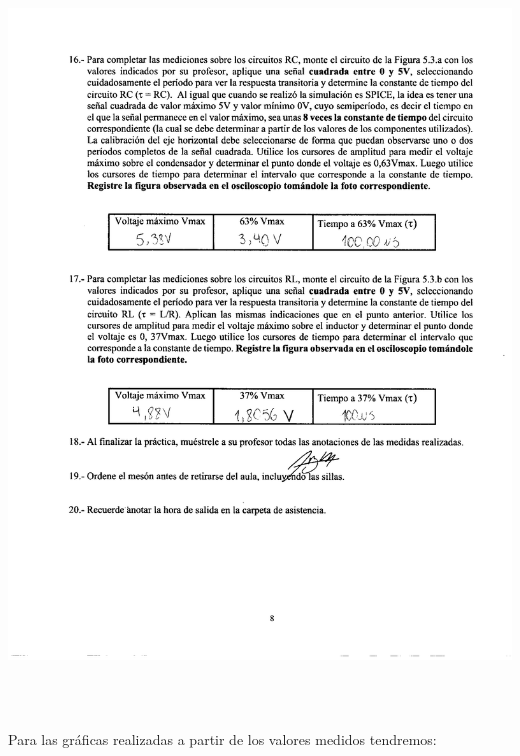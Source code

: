\documentclass[12pt]{article}
\begin{document}
	\begin{center}
		\includegraphics[width=16cm,height=20cm]{Img/anexo_0006}
	\end{center}
	
	\newpage
	
	\noindent Para las gráficas realizadas a partir de los valores medidos tendremos:
	
	
	\renewcommand{\theenumi}{\alph{enumi}} %
	
\end{document}
